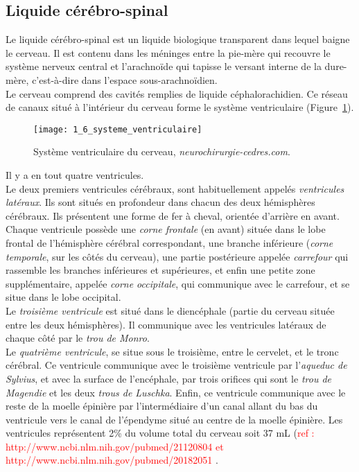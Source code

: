 \subsection{Liquide cérébro-spinal}
Le liquide cérébro-spinal est un liquide biologique transparent dans lequel baigne le cerveau. Il est contenu dans les méninges entre la pie-mère qui recouvre le système nerveux central et l’arachnoïde qui tapisse le versant interne de la dure-mère, c’est-à-dire dans l’espace sous-arachnoïdien.\\
Le cerveau comprend des cavités remplies de liquide céphalorachidien. Ce réseau de canaux situé à l’intérieur du cerveau forme le système ventriculaire (Figure~\ref{fig:1_6_systeme_ventriculaire}).
\begin{figure}[!t]
\centering
\texttt{[image: 1\_6\_systeme\_ventriculaire]}
\caption{Système ventriculaire du cerveau,  {\em neurochirurgie-cedres.com}. }
\label{fig:1_6_systeme_ventriculaire}	
\end{figure}
Il y a en tout quatre ventricules.\\
Le deux premiers ventricules cérébraux, sont habituellement appelés {\em ventricules latéraux}. Ils sont situés en profondeur dans chacun des deux hémisphères cérébraux. Ils présentent une forme de fer à cheval, orientée d'arrière en avant. Chaque ventricule possède une {\em corne frontale} (en avant) située dans le lobe frontal de l'hémisphère cérébral correspondant, une branche inférieure ({\em corne temporale}, sur les côtés du cerveau), une partie postérieure appelée {\em carrefour} qui rassemble les branches inférieures et supérieures, et enfin une petite zone supplémentaire, appelée {\em corne occipitale}, qui communique avec le carrefour, et se situe dans le lobe occipital.\\
Le {\em troisième ventricule} est situé dans le diencéphale (partie du cerveau située entre les deux hémisphères). Il communique avec les ventricules latéraux de chaque côté par le {\em trou de Monro}.\\
Le {\em quatrième ventricule}, se situe sous le troisième, entre le cervelet, et le tronc cérébral. Ce ventricule communique avec le troisième ventricule par l'{\em aqueduc de Sylvius}, et avec la surface de l'encéphale, par trois orifices qui sont le {\em trou de Magendie} et les deux {\em trous de Luschka}. Enfin, ce ventricule communique avec le reste de la moelle épinière par l'intermédiaire d'un canal allant du bas du ventricule vers le canal de l'épendyme situé au centre de la moelle épinière.
Les ventricules représentent 2\% du volume total du cerveau soit 37 mL (\textcolor{red}{ref : http://www.ncbi.nlm.nih.gov/pubmed/21120804 et http://www.ncbi.nlm.nih.gov/pubmed/20182051 } .
